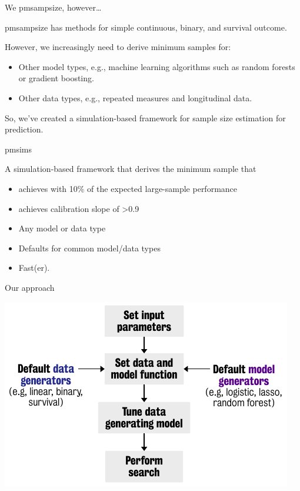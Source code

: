 \documentclass[11pt]{beamer}
\newcommand*{\img}[1]{%
    \raisebox{-.3\baselineskip}{%
        \texttt{[image: \#1]}%
    }%
}
\begin{document}
\begin{frame}[t]{We \img{figures/heart.png} pmsampsize, however\ldots}

    pmsampsize has methods for simple continuous, binary, and survival outcome.

    However, we increasingly need to derive minimum samples for:

    \begin{itemize}
        \item Other model types, e.g., machine learning algorithms
            such as random forests or gradient boosting.
        \item Other data types, e.g., repeated measures and longitudinal data.
    \end{itemize}

    So, we've created a simulation-based framework for sample size estimation
    for prediction.

\end{frame}

\begin{frame}{pmsims}

    A simulation-based framework that derives the minimum sample that

    \begin{itemize}
        \item achieves with 10\% of the expected large-sample performance
        \item achieves calibration slope of >0.9
    \end{itemize}

    \begin{itemize}
        \item Any model or data type
        \item Defaults for common model/data types
        \item Fast(er).
    \end{itemize}

\end{frame}

\begin{frame}[c]{Our approach}

    \includegraphics[width=\textwidth]{figures/workflow1.pdf}

\end{frame}
\end{document}
